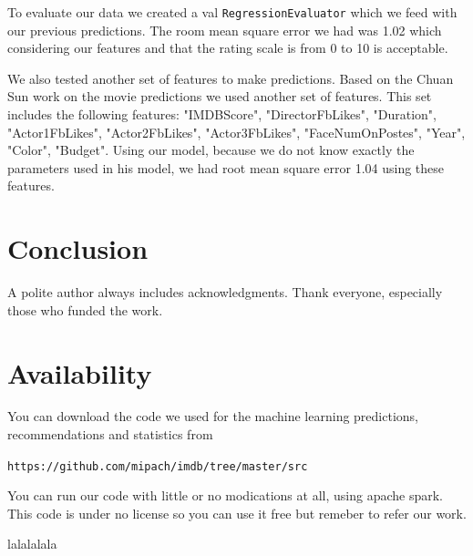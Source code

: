 \documentclass[letterpaper,twocolumn,10pt]{article}
\begin{document}
To evaluate our data we created a val \texttt{RegressionEvaluator} which we feed with our previous predictions. The room mean square error we had was 1.02 which considering our features and that the rating scale is from 0 to 10 is acceptable.

We also tested another set of features to make predictions. Based on the Chuan Sun work on the movie predictions we used another set of features. This set includes the following features: "IMDBScore", "DirectorFbLikes", "Duration", "Actor1FbLikes", "Actor2FbLikes", "Actor3FbLikes", "FaceNumOnPostes", "Year", "Color", "Budget". Using our model, because we do not know exactly the parameters used in his model, we had root mean square error 1.04 using these features.  
\section{Conclusion}

A polite author always includes acknowledgments.  Thank everyone,
especially those who funded the work. 

\section{Availability}

You can download the code we used for the machine learning predictions, recommendations and statistics from

\begin{center}
{\tt https://github.com/mipach/imdb/tree/master/src}\\
\end{center}

You can run our code with little or no modications at all, using apache spark. This code is under no license so you can use it free but remeber to refer our work.


{\footnotesize 
}
lalalalala
\end{document}
